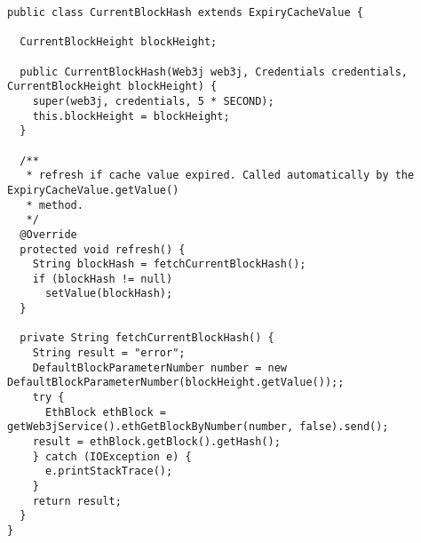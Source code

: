 \begin{lstlisting}[basicstyle=\small]
public class CurrentBlockHash extends ExpiryCacheValue {

  CurrentBlockHeight blockHeight;

  public CurrentBlockHash(Web3j web3j, Credentials credentials, CurrentBlockHeight blockHeight) {
    super(web3j, credentials, 5 * SECOND);
    this.blockHeight = blockHeight;
  }

  /**
   * refresh if cache value expired. Called automatically by the ExpiryCacheValue.getValue()
   * method.
   */
  @Override
  protected void refresh() {
    String blockHash = fetchCurrentBlockHash();
    if (blockHash != null)
      setValue(blockHash);
  }

  private String fetchCurrentBlockHash() {
    String result = "error";
    DefaultBlockParameterNumber number = new DefaultBlockParameterNumber(blockHeight.getValue());;
    try {
      EthBlock ethBlock = getWeb3jService().ethGetBlockByNumber(number, false).send();
    result = ethBlock.getBlock().getHash();
    } catch (IOException e) {
      e.printStackTrace();
    }
    return result;
  }
}
\end{lstlisting}

